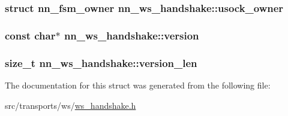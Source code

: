 \subsubsection[{usock\+\_\+owner}]{\setlength{\rightskip}{0pt plus 5cm}struct {\bf nn\+\_\+fsm\+\_\+owner} nn\+\_\+ws\+\_\+handshake\+::usock\+\_\+owner}\hypertarget{structnn__ws__handshake_a464dff1c646c33536bb1b38e66632866}{}\label{structnn__ws__handshake_a464dff1c646c33536bb1b38e66632866}
\subsubsection[{version}]{\setlength{\rightskip}{0pt plus 5cm}const char$\ast$ nn\+\_\+ws\+\_\+handshake\+::version}\hypertarget{structnn__ws__handshake_a48a9a5ca67775c6a84e470550a0a2693}{}\label{structnn__ws__handshake_a48a9a5ca67775c6a84e470550a0a2693}
\subsubsection[{version\+\_\+len}]{\setlength{\rightskip}{0pt plus 5cm}size\+\_\+t nn\+\_\+ws\+\_\+handshake\+::version\+\_\+len}\hypertarget{structnn__ws__handshake_a03669e42c930987c0b22fb800a8bb99f}{}\label{structnn__ws__handshake_a03669e42c930987c0b22fb800a8bb99f}


The documentation for this struct was generated from the following file\+:\begin{DoxyCompactItemize}
\item 
src/transports/ws/\hyperlink{ws__handshake_8h}{ws\+\_\+handshake.\+h}\end{DoxyCompactItemize}
